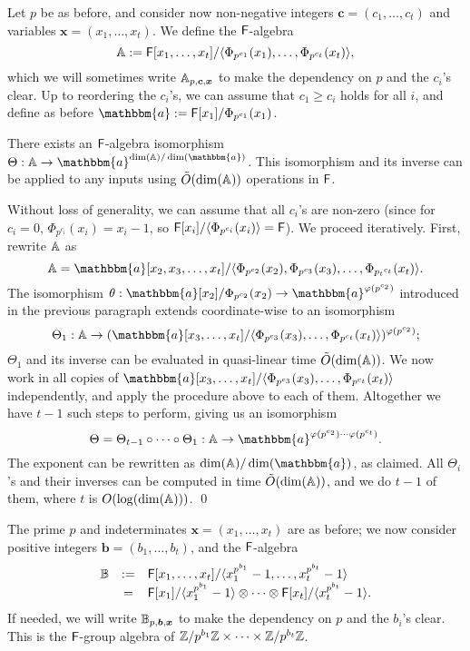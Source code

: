 \smallskip{}
Let $p$ be as before, and consider now non-negative integers
$\boldsymbol{c}=(c_1,\dots,c_t)$ and variables $\boldsymbol{x}=(x_1,\dots,x_t)$. We
define the ${\mathsf{F}}$-algebra
$$\mathbb{A}:={\mathsf{F}}[x_1,\dots,x_t]/\langle \Phi_{p^{c_1}}(x_1), \dots,
\Phi_{p^{c_t}}(x_t)\rangle,$$ which we will sometimes write
$\mathbb{A}_{p,\boldsymbol{c},\boldsymbol{x}}$ to make the dependency on $p$
and the $c_i$'s clear. Up to reordering the $c_i$'s, we can assume
that $c_1 \ge c_i$ holds for all $i$, and define as before
$\mathbbm{a}:=\F[x_1]/\Phi_{p^{c_1}}(x_1)$.

\begin{lemma}\label{lemma:A}
  There exists an ${\mathsf{F}}$-algebra isomorphism $\Theta: \A \to
  \mathbbm{a}^{\dim(\A)/\dim(\mathbbm{a})}$. This isomorphism and its
  inverse can be applied to any inputs using $\tilde{O}(\dim(\mathbb{A}))$
  operations in ${\mathsf{F}}$.
\end{lemma}
Without loss of generality, we can assume that all $c_i$'s are non-zero
(since for $c_i=0$, $\Phi_{p^{c_i}}(x_i)=x_i-1$,
so ${\mathsf{F}}[x_i]/\langle \Phi_{p^{c_i}}(x_i) \rangle = {\mathsf{F}}$).
We proceed iteratively. First, rewrite $\mathbb{A}$ as
$$\A=\mathbbm{a}[x_2,x_3,\dots,x_t]/\langle \Phi_{p^{c_2}}(x_2), \Phi_{p^{c_3}}(x_3), \dots,
\Phi_{{p_t}^{c_t}}(x_t)\rangle.$$ 
The isomorphism 
$\theta: \mathbbm{a}[x_2]/\Phi_{p^{c_2}}(x_2) \to \mathbbm{a}^{\varphi(p^{c_2})}$
introduced in the previous paragraph extends coordinate-wise
to an isomorphism 
$$\Theta_1: \A \to (\mathbbm{a}[x_3,\dots,x_t]/\langle
\Phi_{p^{c_3}}(x_3), \dots,
\Phi_{p^{c_t}}(x_t)\rangle)^{\varphi(p^{c_2})};$$ $\Theta_1$ and its
inverse can be evaluated in quasi-linear time $\tilde{O}(\dim(\mathbb{A}))$.
We now work in all copies of $\mathbbm{a}[x_3,\dots,x_t]/\langle
\Phi_{p^{c_3}}(x_3), \dots, \Phi_{p^{c_t}}(x_t)\rangle$ independently,
and apply the procedure above to each of them. Altogether we have
$t-1$ such steps to perform, giving us an isomorphism
$$\Theta = \Theta_{t-1} \circ \cdots \circ \Theta_1:
\A \to
\mathbbm{a}^{\varphi(p^{c_2}) \cdots \varphi(p^{c_t})}.$$
The exponent can be rewritten as $ \dim(\A)/\dim(\mathbbm{a})$, as claimed.
All $\Theta_i$'s and their inverses can be computed
in time $\tilde{O}(\dim(\mathbb{A}))$, and we do $t-1$ of them,
where $t$ is $O(\log(\dim(\mathbb{A})))$. 
\qed

  The prime $p$
and indeterminates $\boldsymbol{x}=(x_1,\dots,x_t)$ are as before; we now consider
positive integers $\boldsymbol{b}=(b_1,\dots,b_t)$, and the ${\mathsf{F}}$-algebra
\[
\begin{array}{ccl}
\B&:=&\F[x_1,\dots,x_t]/\langle x_1^{p^{b_1}}-1,\dots,x_t^{p^{b_t}}-1\rangle\\$$
&=& \F[x_1]/\langle x_1^{p^{b_1}}-1 \rangle \otimes \cdots \otimes \F[x_t]/\langle x_t^{p^{b_t}}-1 \rangle.
\end{array}
\]
If needed, we will write $\mathbb{B}_{p,\boldsymbol{b},\boldsymbol{x}}$ to make the dependency
on $p$ and the $b_i$'s clear. This is the ${\mathsf{F}}$-group algebra
of $\mathbb{Z}/p^{b_1}\mathbb{Z} \times \cdots \times \mathbb{Z}/p^{b_t}\mathbb{Z}$.

